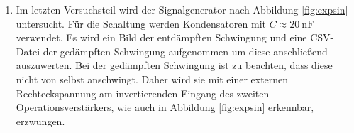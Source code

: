 \begin{enumerate}
  \item Im letzten Versuchsteil wird der Signalgenerator nach Abbildung \ref{fig:expsin} untersucht. Für die
  Schaltung werden Kondensatoren mit $C \approx \SI{20}{\nano\farad}$ verwendet. Es wird ein Bild der
  entdämpften Schwingung und eine CSV-Datei der gedämpften Schwingung aufgenommen um diese anschließend
  auszuwerten. Bei der gedämpften Schwingung ist zu beachten, dass diese nicht von selbst anschwingt. Daher
  wird sie mit einer externen Rechteckspannung am invertierenden Eingang des zweiten Operationsverstärkers, wie auch
  in Abbildung \ref{fig:expsin} erkennbar, erzwungen.
\end{enumerate}
